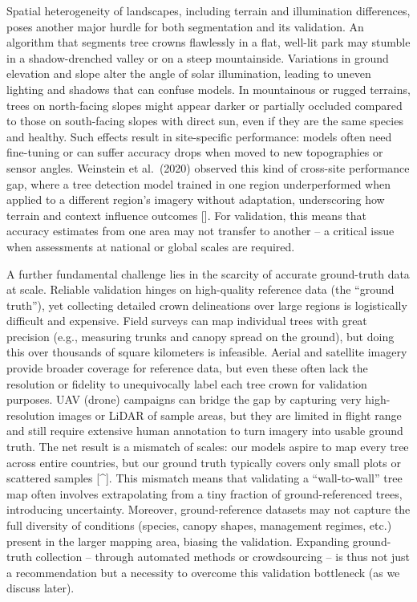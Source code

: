 \documentclass[runningheads]{llncs}
\begin{document}
Spatial heterogeneity of landscapes, including terrain and illumination
differences, poses another major hurdle for both segmentation and its
validation. An algorithm that segments tree crowns flawlessly in a flat,
well-lit park may stumble in a shadow-drenched valley or on a steep
mountainside. Variations in ground elevation and slope alter the angle
of solar illumination, leading to uneven lighting and shadows that can
confuse models. In mountainous or rugged terrains, trees on north-facing
slopes might appear darker or partially occluded compared to those on
south-facing slopes with direct sun, even if they are the same species
and healthy. Such effects result in site-specific performance: models
often need fine-tuning or can suffer accuracy drops when moved to new
topographies or sensor angles. Weinstein et al.~(2020) observed this
kind of cross-site performance gap, where a tree detection model trained
in one region underperformed when applied to a different region's
imagery without adaptation, underscoring how terrain and context
influence outcomes {[}\cite{weinstein2020cross}{]}. For validation, this
means that accuracy estimates from one area may not transfer to another
-- a critical issue when assessments at national or global scales are
required.

A further fundamental challenge lies in the scarcity of accurate
ground-truth data at scale. Reliable validation hinges on high-quality
reference data (the ``ground truth''), yet collecting detailed crown
delineations over large regions is logistically difficult and expensive.
Field surveys can map individual trees with great precision (e.g.,
measuring trunks and canopy spread on the ground), but doing this over
thousands of square kilometers is infeasible. Aerial and satellite
imagery provide broader coverage for reference data, but even these
often lack the resolution or fidelity to unequivocally label each tree
crown for validation purposes. UAV (drone) campaigns can bridge the gap
by capturing very high-resolution images or LiDAR of sample areas, but
they are limited in flight range and still require extensive human
annotation to turn imagery into usable ground truth. The net result is a
mismatch of scales: our models aspire to map every tree across entire
countries, but our ground truth typically covers only small plots or
scattered samples {[}\^{}{]}. This mismatch means that validating a
``wall-to-wall'' tree map often involves extrapolating from a tiny
fraction of ground-referenced trees, introducing uncertainty. Moreover,
ground-reference datasets may not capture the full diversity of
conditions (species, canopy shapes, management regimes, etc.) present in
the larger mapping area, biasing the validation. Expanding ground-truth
collection -- through automated methods or crowdsourcing -- is thus not
just a recommendation but a necessity to overcome this validation
bottleneck (as we discuss later).
\end{document}
